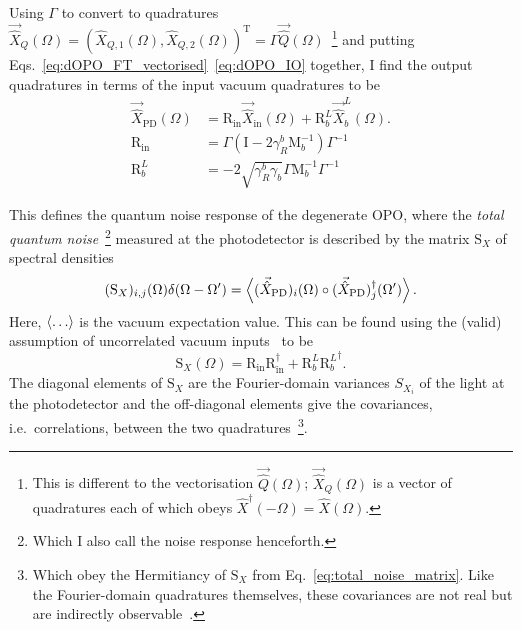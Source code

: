 Using $\Gamma$ to convert to quadratures $\vec{\hat{X}}_Q(\Omega)=(\hat{X}_{Q,1}(\Omega),\hat{X}_{Q,2}(\Omega))^\text{T}=\Gamma \vec{\hat{Q}}(\Omega)$~\footnote{This is different to the vectorisation $\vec{\hat{Q}}(\Omega)$; $\vec{\hat{X}}_Q(\Omega)$ is a vector of quadratures each of which obeys $\hat{X}^\dag(-\Omega)=\hat{X}(\Omega)$.} and putting Eqs.~\ref{eq:dOPO_FT_vectorised}~\ref{eq:dOPO_IO} together, I find the output quadratures in terms of the input vacuum quadratures to be
\begin{align}
\label{eq:dOPO_PD_as_fn_of_vac}
\vec{\hat X}_\mathrm{PD}(\Omega)&=\text{R}_\text{in}\vec{\hat X}_\mathrm{in}(\Omega)+\text{R}^L_b\vec{\hat X}^L_b(\Omega).\\
\text{R}_\text{in}&=\Gamma\left(\text{I}-2\gamma^b_R\text{M}_b^{-1}\right)\Gamma^{-1} \\
\text{R}^L_b&=-2\sqrt{\gamma^b_R \gamma_b}\Gamma\text{M}_b^{-1}\Gamma^{-1}%
\end{align}

This defines the quantum noise response of the degenerate OPO, where the \emph{total quantum noise}~\footnote{Which I also call the noise response henceforth.} measured at the photodetector is described by the matrix $\text{S}_X$ of spectral densities 
\begin{equation}\label{eq:total_noise_matrix}
(\text{S}_X)_{i,j}(\Omega)\delta(\Omega-\Omega')=\ev{(\vec{\hat X}_\text{PD})_i(\Omega)\circ(\vec{\hat X}_\text{PD})_j^\dag(\Omega')}.
\end{equation}
Here, $\ev{\ldots}$ is the vacuum expectation value. This can be found using the (valid) assumption of uncorrelated vacuum inputs~\cite{} to be
\begin{equation}\label{eq:dOPO_Sx_abstract}
\text{S}_X(\Omega)=\text{R}_\text{in} \text{R}_\text{in}^\dag+\text{R}^L_b {\text{R}^L_b}^\dag. %
\end{equation}
The diagonal elements of $\text{S}_X$ are the Fourier-domain variances $S_{X_i}$ of the light at the photodetector and the off-diagonal elements give the covariances, i.e.\ correlations, between the two quadratures~\footnote{Which obey the Hermitiancy of $\text{S}_X$ from Eq.~\ref{eq:total_noise_matrix}. Like the Fourier-domain quadratures themselves, these covariances are not real but are indirectly observable~\cite{}.}.


